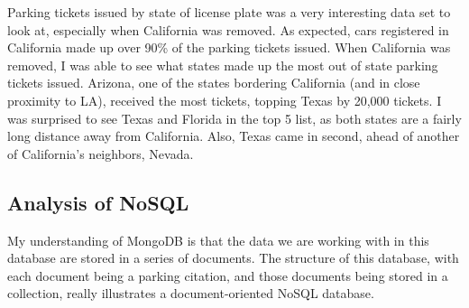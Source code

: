 \documentclass[]{article}
\begin{document}
Parking tickets issued by state of license plate was a very interesting data set to look at, especially when California was removed.  As expected, cars registered in California made up over 90\% of the parking tickets issued.  When California was removed, I was able to see what states made up the most out of state parking tickets issued.  Arizona, one of the states bordering California (and in close proximity to LA), received the most tickets, topping Texas by 20,000 tickets.  I was surprised to see Texas and Florida in the top 5 list, as both states are a fairly long distance away from California.  Also, Texas came in second, ahead of another of California's neighbors, Nevada.

\subsection{Analysis of NoSQL}

My understanding of MongoDB is that the data we are working with in this database are stored in a series of documents.  The structure of this database, with each document being a parking citation, and those documents being stored in a collection, really illustrates a document-oriented NoSQL database.
\end{document}

